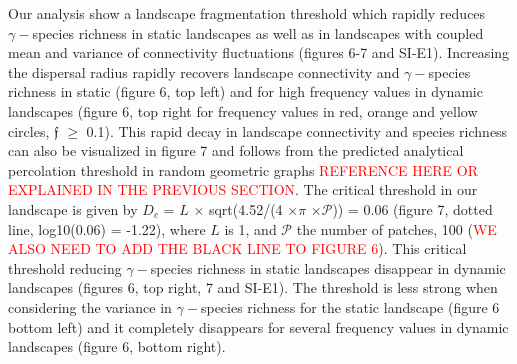 \documentclass[12pt]{article}
\newcommand{\carlos}[1]{\textcolor{Red}{#1}}
\begin{document}
Our analysis show a landscape fragmentation threshold which rapidly reduces $\gamma-$species richness in static landscapes as well as in landscapes with coupled mean and variance of connectivity fluctuations (figures 6-7 and SI-E1). Increasing the dispersal radius rapidly recovers landscape connectivity and $\gamma-$species richness in static (figure 6, top left) and for high frequency values in dynamic landscapes (figure 6, top right for frequency values in red, orange and yellow circles, $\mathfrak{f}$ $\geq$ 0.1). This rapid decay in landscape connectivity and species richness can also be visualized in figure 7 and follows from the predicted analytical percolation threshold in random geometric graphs \carlos{REFERENCE HERE OR EXPLAINED IN THE PREVIOUS SECTION}. The critical threshold in our landscape is given by $D_c$ = $L$ $\times$ sqrt(4.52/(4 $\times$$\pi$ $\times$$\mathcal{P}$)) = 0.06 (figure 7, dotted line, log10(0.06) = -1.22), where $L$ is 1, and $\mathcal{P}$ the number of patches, 100 (\carlos{WE ALSO NEED TO ADD THE BLACK LINE TO FIGURE 6}). This critical threshold reducing $\gamma-$species richness in static landscapes disappear in dynamic landscapes (figures 6, top right, 7 and SI-E1). The threshold is less strong when considering the variance in $\gamma-$species richness for the static landscape (figure 6 bottom left) and it completely disappears for several frequency values in dynamic landscapes (figure 6, bottom right). 
\end{document}
